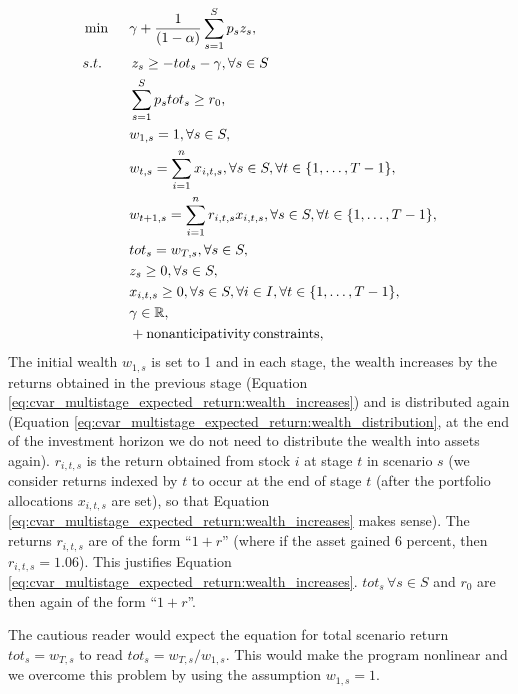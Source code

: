 \begin{alignat}{10}
& \min \, \, \, && \gamma + \frac{1}{(1-\alpha)} \sum_{s=1}^S p_s z_s, \label{eq:cvar_multistage_expected_return}  \\
&s.t. && \, z_s \geq  -tot_s -\gamma, \forall s \in S \nonumber \\
&  && \sum_{s=1}^{S} p_s tot_s \geq r_0, \nonumber \\
& && w_{1,s}=1, \forall s \in S, \nonumber \\
& && w_{t,s}=\sum_{i=1}^{n} x_{i,t,s}, \forall s \in S, \forall t \in \{1,\dots,T-1\}, \label{eq:cvar_multistage_expected_return:wealth_distribution} \\
& && w_{t+1,s}=\sum_{i=1}^{n} r_{i,t,s} x_{i,t,s}, \forall s \in S, \forall t \in \{1,\dots ,T-1\}, \label{eq:cvar_multistage_expected_return:wealth_increases} \\
& && tot_s = w_{T,s}, \forall s \in S, \nonumber \\
& && z_s \geq 0, \forall s \in S, \nonumber \\
& && x_{i,t,s} \geq 0, \forall s \in S, \forall i \in I, \forall t \in \{1,\dots ,T-1\}, \nonumber \\
& && \gamma \in \R ,\nonumber \\
& && + \mathrm{nonanticipativity \, constraints}, \nonumber
\end{alignat}
The initial wealth $w_{1,s}$ is set to 1 and in each stage, the wealth increases by the returns obtained in the previous stage (Equation \ref{eq:cvar_multistage_expected_return:wealth_increases}) and is distributed again (Equation \ref{eq:cvar_multistage_expected_return:wealth_distribution}, at the end of the investment horizon we do not need to distribute the wealth into assets again). $r_{i,t,s}$ is the return obtained from stock $i$ at stage $t$ in scenario $s$ (we consider returns indexed by $t$ to occur at the end of stage $t$ (after the portfolio allocations $x_{i,t,s}$ are set), so that Equation \ref{eq:cvar_multistage_expected_return:wealth_increases} makes sense). The returns $r_{i,t,s}$ are of the form “$1+r$” (where if the asset gained 6 percent, then $r_{i,t,s}=1.06$). This justifies Equation \ref{eq:cvar_multistage_expected_return:wealth_increases}. $tot_s \, \forall s \in S$ and $r_0$ are then again of the form “$1+r$”. 

\begin{rem}
The cautious reader would expect the equation for total scenario return $tot_s = w_{T,s}$ to read $tot_s = w_{T,s}/w_{1,s}$. This would make the program nonlinear and we overcome this problem by using the assumption $w_{1,s}=1$.
\end{rem}


